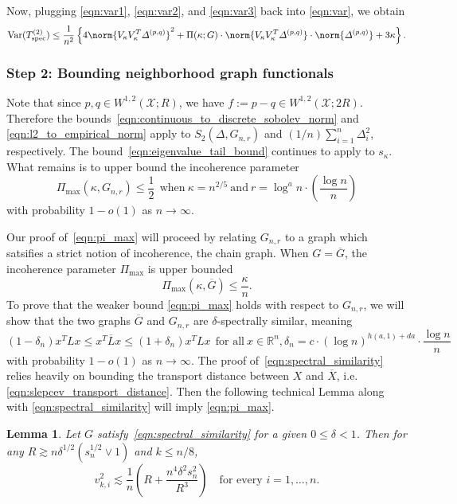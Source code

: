 \documentclass{article}
\newcommand{\Reals}{\mathbb{R}}
\newcommand{\Var}{\mathrm{Var}}
\newcommand{\1}{\mathbf{1}}
\newcommand{\vardeltapq}{\varDelta^{(p,q)}}
\newcommand{\spec}{\mathrm{spec}}
\theoremstyle{alden}
\theoremstyle{aldenthm}
\newtheorem{lemma}{Lemma}
\theoremstyle{definition}
\theoremstyle{remark}
\begin{document}
Now, plugging \eqref{eqn:var1}, \eqref{eqn:var2}, and \eqref{eqn:var3} back into \eqref{eqn:var}, we obtain
\begin{equation}
\label{eqn:var_5}
\Var(T_{\spec}^{(2)}) \leq \frac{1}{n^2}\left\{4\norm{V_{\kappa}V_{\kappa}^T \vardeltapq}^2 + \Pi(\kappa;G) \cdot \norm{V_{\kappa}V_{\kappa}^T \vardeltapq} \cdot \norm{\vardeltapq} + 3\kappa \right\}.
\end{equation}


\subsubsection{Step 2: Bounding neighborhood graph functionals}

Note that since $p,q \in W^{1,2}(\mathcal{X};R)$, we have $f := p - q \in W^{1,2}(\mathcal{X};2R)$. Therefore the bounds~\eqref{eqn:continuous_to_discrete_sobolev_norm} and \eqref{eqn:l2_to_empirical_norm} apply to $S_2(\varDelta,G_{n,r})$ and $(1/n)\sum_{i = 1}^{n}\varDelta_i^2$, respectively. The bound~\eqref{eqn:eigenvalue_tail_bound} continues to apply to $s_{\kappa}$. What remains is to upper bound the incoherence parameter
\begin{equation}
\label{eqn:pi_max}
\Pi_{\max}(\kappa,G_{n,r}) \leq \frac{1}{2}~~\textrm{when}~ \kappa = n^{2/5}~\textrm{and}~ r = \log^a n \cdot \left(\frac{\log n}{n}\right)
\end{equation}
with probability $1 - o(1)$ as $n \to \infty$.

Our proof of~\eqref{eqn:pi_max} will proceed by relating $G_{n,r}$ to a graph which satsifies a strict notion of incoherence, the chain graph. When $G = \overline{G}$, the incoherence parameter $\Pi_{\max}$ is upper bounded
\begin{equation}
\Pi_{\max}(\kappa,\overline{G}) \leq \frac{\kappa}{n}.
\end{equation}
To prove that the weaker bound \eqref{eqn:pi_max} holds with respect to $G_{n,r}$, we will show that the two graphs $\overline{G}$ and $G_{n,r}$ are $\delta$-spectrally similar, meaning
\begin{equation}
\label{eqn:spectral_similarity}
(1 - \delta_n) x^T L x \leq x^T \overline{L} x \leq (1 + \delta_n) x^T L x~~\textrm{for all}~x \in \Reals^n, \delta_n = c \cdot (\log n)^{h(a,1) + da}\cdot \frac{\log n}{n}
\end{equation}
with probability $1 - o(1)$ as $n \to \infty$. The proof of~\eqref{eqn:spectral_similarity} relies heavily on bounding the transport distance between $X$ and $\overline{X}$, i.e. \eqref{eqn:slepcev_transport_distance}. Then the following technical Lemma along with \eqref{eqn:spectral_similarity} will imply \eqref{eqn:pi_max}.
\begin{lemma}
	\label{lem:pi_max_pf_1}
	Let $G$ satisfy~\eqref{eqn:spectral_similarity} for a given $0 \leq \delta < 1$. Then for any $R \gtrsim n \delta^{1/2} (s_{n}^{1/2} \vee 1)$ and $k \leq n/8$,
	\begin{equation*}
	v_{k,i}^2 \lesssim \frac{1}{n}\left(R + \frac{n^4 \delta^2 s_{n}^2}{R^3}\right) \quad \textrm{for every $i = 1,\ldots,n$.}
	\end{equation*} 
\end{lemma}
\end{document}
